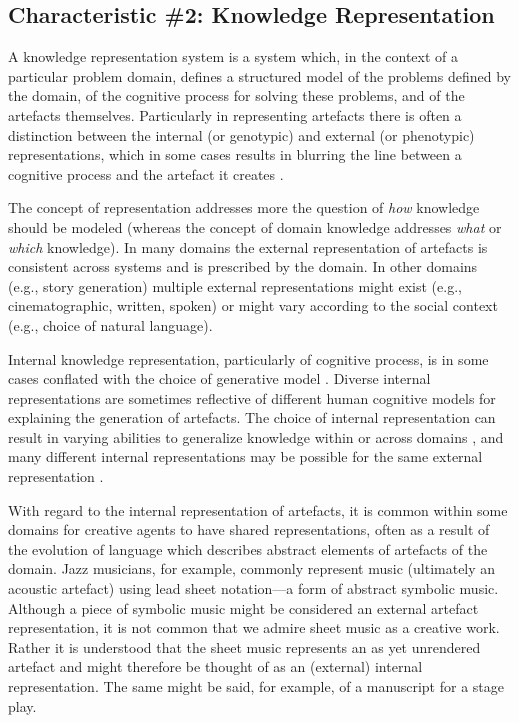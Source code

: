 \documentclass[phd,electronic,oneside,twosidetoc,letterpaper,chaptercenter,parttop,lol,lof,lot]{byumsphd}
\begin{document}
\subsection{Characteristic \#2: Knowledge Representation}

A knowledge representation system is a system which, in the context of a particular problem domain, defines a structured model of the problems defined by the domain, of the cognitive process for solving these problems, and of the artefacts themselves. Particularly in representing artefacts there is often a distinction between the internal (or genotypic) and external (or phenotypic) representations, which in some cases results in blurring the line between a cognitive process and the artefact it creates \citep{Ventura2017HowSystem}.

The concept of representation addresses more the question of \textit{how} knowledge should be modeled (whereas the concept of domain knowledge addresses \textit{what} or \textit{which} knowledge). In many domains the external representation of artefacts is consistent across systems and is prescribed by the domain. In other domains (e.g., story generation) multiple external representations might exist (e.g., cinematographic, written, spoken) or might vary according to the social context (e.g., choice of natural language). 

Internal knowledge representation, particularly of cognitive process, is in some cases conflated with the choice of generative model \citep{Ventura2017HowSystem}. Diverse internal representations are sometimes reflective of different human cognitive models for explaining the generation of artefacts. The choice of internal representation can result in varying abilities to generalize knowledge within or across domains \citep{Lake2015}, and many different internal representations may be possible for the same external representation \citep{Ventura2016}.

With regard to the internal representation of artefacts, it is common within some domains for creative agents to have shared representations, often as a result of the evolution of language which describes abstract elements of artefacts of the domain. Jazz musicians, for example, commonly represent music (ultimately an acoustic artefact) using lead sheet notation---a form of abstract symbolic music. Although a piece of symbolic music might be considered an external artefact representation, it is not common that we admire sheet music as a creative work. Rather it is understood that the sheet music represents an as yet unrendered artefact and might therefore be thought of as an (external) internal representation. The same might be said, for example, of a manuscript for a stage play.
\end{document}
